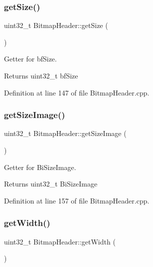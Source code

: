 \subsubsection{\texorpdfstring{getSize()}{getSize()}}
{\footnotesize\ttfamily uint32\+\_\+t Bitmap\+Header\+::get\+Size (\begin{DoxyParamCaption}{ }\end{DoxyParamCaption})}



Getter for bf\+Size. 

\begin{DoxyReturn}{Returns}
uint32\+\_\+t bf\+Size 
\end{DoxyReturn}


Definition at line 147 of file Bitmap\+Header.\+cpp.

\mbox{\label{classBitmapHeader_aa55f157d6852ce35add8c5db54ccadae}} 
\subsubsection{\texorpdfstring{getSizeImage()}{getSizeImage()}}
{\footnotesize\ttfamily uint32\+\_\+t Bitmap\+Header\+::get\+Size\+Image (\begin{DoxyParamCaption}{ }\end{DoxyParamCaption})}



Getter for Bi\+Size\+Image. 

\begin{DoxyReturn}{Returns}
uint32\+\_\+t Bi\+Size\+Image 
\end{DoxyReturn}


Definition at line 157 of file Bitmap\+Header.\+cpp.

\mbox{\label{classBitmapHeader_af1d36ee9f3315866f05c39c2f4871e09}} 
\subsubsection{\texorpdfstring{getWidth()}{getWidth()}}
{\footnotesize\ttfamily uint32\+\_\+t Bitmap\+Header\+::get\+Width (\begin{DoxyParamCaption}{ }\end{DoxyParamCaption})}



